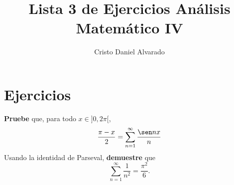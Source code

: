 \documentclass[12pt]{report}
\theoremstyle{largebreak}
\begin{document}
    \setlength{\parskip}{5pt} %
    \setlength{\parindent}{12pt} %
    \title{Lista 3 de Ejercicios Análisis Matemático IV}
    \author{Cristo Daniel Alvarado}
    \maketitle

    \tableofcontents %

    \setcounter{chapter}{2} %
    
    \chapter{Ejercicios}
    
    \setcounter{section}{1}

    \begin{excer}
        \textbf{Pruebe} que, para todo $x\in]0,2\pi[$,
        \begin{equation*}
            \frac{\pi-x}{2}=\sum_{ n=1}^\infty\frac{\sen nx}{n}
        \end{equation*}
        Usando la identidad de Parseval, \textbf{demuestre} que
        \begin{equation*}
            \sum_{ n=1}^\infty\frac{1}{n^2}=\frac{\pi^2}{6}.
        \end{equation*}
    \end{excer}
\end{document}
